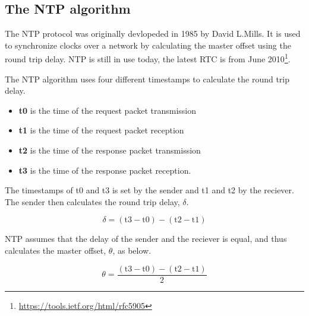 \subsection{The NTP algorithm}
\label{sec:ntp}

The NTP protocol\cite{mills} was originally devlopeded in 1985 by David L.Mills. It is used to synchronize clocks over a network by calculating the master offset using the round trip delay. NTP is still in use today, the latest RTC is from June 2010\footnote{\url{https://tools.ietf.org/html/rfc5905}}.

The NTP algorithm uses four different timestamps to calculate the round trip delay. 

\begin{itemize}
  \item[] \textbf{t0} is the time of the request packet transmission
  \item[] \textbf{t1} is the time of the request packet reception
  \item[] \textbf{t2} is the time of the response packet transmission
  \item[] \textbf{t3} is the time of the response packet reception.
\end{itemize}
\label{fig:ntpvars}

The timestamps of t0 and t3 is set by the sender and t1 and t2 by the reciever. The sender then calculates the round trip delay, $\delta$. 

\begin{displaymath}
	\delta = (\text{t3} - \text{t0}) - (\text{t2} - \text{t1})
\end{displaymath}
\label{fig:ntpdelta}

NTP assumes that the delay of the sender and the reciever is equal, and thus calculates the master offset, $\theta$,  as below. 

\begin{displaymath}
	\theta = \frac{(\text{t3} - \text{t0}) - (\text{t2} - \text{t1})}{2}
\end{displaymath}
\label{fig:ntpmo}

